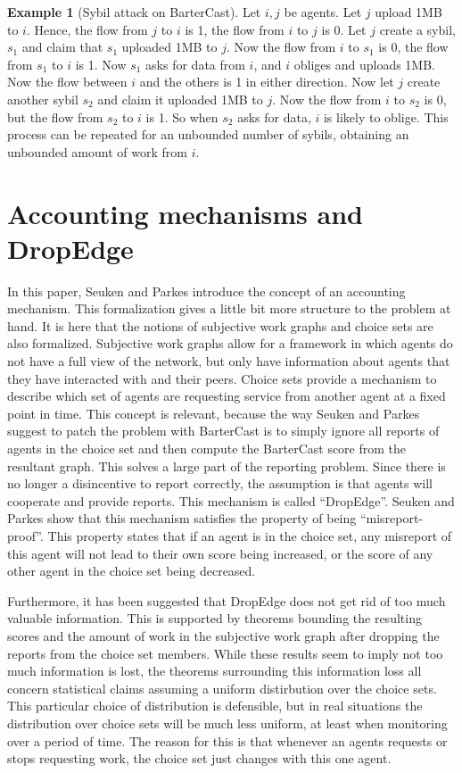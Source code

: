 \documentclass[a4paper,11pt]{book}
\theoremstyle{definition}
\newtheorem*{example}{Example}
\begin{document}
\begin{example}[Sybil attack on BarterCast]
     Let $i, j$ be agents. Let $j$ upload 1MB to $i$. Hence, the flow from $j$ to $i$ is 1, the flow
    from $i$ to $j$ is 0. Let $j$ create a sybil, $s_1$ and claim that $s_1$ uploaded 1MB to $j$.
    Now the flow from $i$ to $s_1$ is $0$, the flow from $s_1$ to $i$ is 1. Now $s_1$ asks
    for data from $i$, and $i$ obliges and uploads 1MB. Now the flow between $i$ and the others is
    1 in either direction. Now let $j$ create another sybil $s_2$ and claim it uploaded 1MB to $j$. 
    Now the flow from $i$ to $s_2$ is 0, but the flow from $s_2$ to $i$ is 1. 
    So when $s_2$ asks for data, $i$ is likely to oblige. This process can be repeated for an unbounded
    number of sybils, obtaining an unbounded amount of work from $i$.
\end{example}

\section{Accounting mechanisms and DropEdge}

In this paper, Seuken and Parkes introduce the concept of an accounting mechanism. This formalization gives
a little bit more structure to the problem at hand. It is here that the notions of subjective work graphs
and choice sets are also formalized. Subjective work graphs allow for a framework in which agents
do not have a full view of the network, but only have information about agents that they have interacted
with and their peers. Choice sets provide a mechanism to describe which set of agents are requesting
service from another agent at a fixed point in time. 
This concept is relevant, because the way
Seuken and Parkes suggest to patch the problem with BarterCast is to simply ignore all reports of agents
in the choice set and then compute the BarterCast score from the resultant graph.
This solves a large part of the reporting problem. Since there is no longer a disincentive
to report correctly, the assumption is that agents will cooperate and provide reports.
This mechanism is called ``DropEdge''. Seuken and Parkes show that this mechanism satisfies the property
of being ``misreport-proof''. This property states that if an agent is in the choice set, 
any misreport of this agent will not lead to their own score being increased, or the score of
any other agent in the choice set being decreased.

Furthermore, it has been suggested that DropEdge does not get rid of too much valuable information.
This is supported by theorems bounding the resulting scores and the amount of work in the subjective
work graph after dropping the reports from the choice set members. While these results seem to imply
not too much information is lost, the theorems surrounding this information loss all concern statistical
claims assuming a uniform distirbution over the choice sets. This particular choice of distribution is
defensible, but in real situations the distribution over choice sets will be much less uniform, at least
when monitoring over a period of time. The reason for this is that whenever an agents requests or
stops requesting work, the choice set just changes with this one agent.
\end{document}
